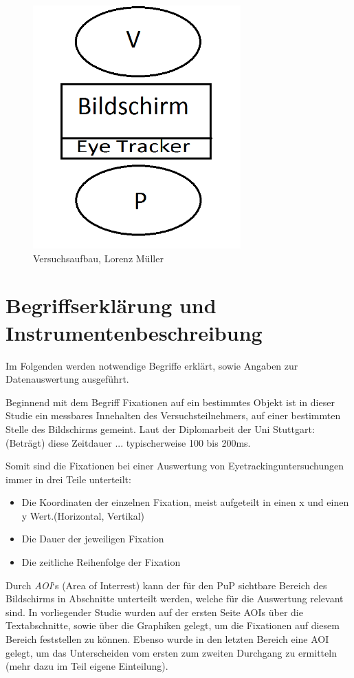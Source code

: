 \begin{figure}[H]
\noindent\hspace{0.5mm}\includegraphics[width=8cm]{./Ressourcen/Versuchsaufbau.png}
\caption{Versuchsaufbau, Lorenz Müller}
\end{figure}

\section{Begriffserklärung und Instrumentenbeschreibung}
Im Folgenden werden notwendige Begriffe erklärt, sowie Angaben zur Datenauswertung ausgeführt.


Beginnend mit dem Begriff \grqq Fixationen auf ein bestimmtes Objekt \grqq ist in dieser Studie ein messbares Innehalten des Versuchsteilnehmers, auf einer bestimmten Stelle des Bildschirms gemeint. Laut der Diplomarbeit  der Uni Stuttgart: \grqq (Beträgt) diese Zeitdauer ... typischerweise 100 bis 200ms.\grqq

Somit sind die Fixationen bei einer Auswertung von Eyetrackinguntersuchungen immer in drei Teile unterteilt:
    \begin{itemize}
        \item Die Koordinaten der einzelnen Fixation, meist aufgeteilt in einen x und einen y Wert.(Horizontal, Vertikal)
        \item Die Dauer der jeweiligen Fixation
        \item Die zeitliche Reihenfolge der Fixation
    \end{itemize}


Durch \textit{AOI}`s (\grqq Area of Interrest\grqq) kann der für den \gls{PuP} sichtbare Bereich des Bildschirms in Abschnitte unterteilt werden, welche für die Auswertung relevant sind. In vorliegender Studie wurden auf der ersten Seite AOIs über die Textabschnitte, sowie über die Graphiken gelegt, um die Fixationen auf diesem Bereich feststellen zu können. Ebenso wurde in den letzten Bereich eine AOI gelegt, um das Unterscheiden vom ersten zum zweiten Durchgang zu ermitteln (mehr dazu im Teil eigene Einteilung).

